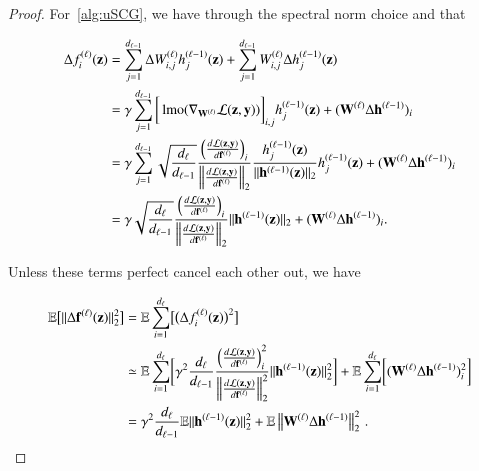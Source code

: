 

\begin{proof}
For~\cref{alg:uSCG}, we have through the spectral norm choice  and  that


\begin{equation*}
\begin{split}
    \Delta f^{(\ell)}_i(\mathbf{z}) &= \sum_{j=1}^{d_{\ell-1}} \Delta W^{(\ell)}_{i,j} h^{(\ell-1)}_j(\mathbf{z}) + \sum_{j=1}^{d_{\ell-1}} W^{(\ell)}_{i,j} \Delta h^{(\ell-1)}_j(\mathbf{z}) \\
    &= \gamma \sum_{j=1}^{d_{\ell-1}} \bigg[\operatorname{lmo}(\nabla_{\mathbf{W}^{(\ell)}} \mathcal{L}(\mathbf{z},\mathbf{y}))\bigg]_{i,j} h^{(\ell-1)}_j(\mathbf{z}) + (\mathbf{W}^{(\ell)} \Delta \mathbf{h}^{(\ell-1)})_i \\
    &= \gamma \sum_{j=1}^{d_{\ell-1}} \sqrt{\frac{d_{\ell}}{d_{\ell-1}}} \frac{\Bigl(\frac{d \mathcal{L}(\mathbf{z},\mathbf{y}) }{d \mathbf{f}^{(\ell)}} \Bigr)_i}{\Bigl\|\frac{d \mathcal{L}(\mathbf{z},\mathbf{y}) }{d \mathbf{f}^{(\ell)}}\Bigr\|_2}  \frac{h^{(\ell-1)}_j(\mathbf{z})}{\|\mathbf{h}^{(\ell-1)}(\mathbf{z})\|_2}  h^{(\ell-1)}_j(\mathbf{z}) + (\mathbf{W}^{(\ell)} \Delta \mathbf{h}^{(\ell-1)})_i \\
    &= \gamma \sqrt{\frac{d_{\ell}}{d_{\ell-1}}} \frac{\Bigl(\frac{d \mathcal{L}(\mathbf{z},\mathbf{y}) }{d \mathbf{f}^{(\ell)}} \Bigr)_i}{\Bigl\|\frac{d \mathcal{L}(\mathbf{z},\mathbf{y}) }{d \mathbf{f}^{(\ell)}}\Bigr\|_2}  \|\mathbf{h}^{(\ell-1)}(\mathbf{z})\|_2 + (\mathbf{W}^{(\ell)} \Delta \mathbf{h}^{(\ell-1)})_i.
\end{split}
\end{equation*}

Unless these terms perfect cancel each other out, we have

\begin{equation*}
\begin{split}
    \mathbb{E}\bigl[\|\Delta \mathbf{f}^{(\ell)}(\mathbf{z})\|_2^2\bigr] &= \mathbb{E}\sum_{i=1}^{d_{\ell}} \bigl[\big(\Delta f^{(\ell)}_i(\mathbf{z})\big)^2\bigr] \\
    &\simeq \mathbb{E}\sum_{i=1}^{d_{\ell}} \biggl[\gamma^2 \frac{d_{\ell}}{d_{\ell-1}} \frac{\Bigl(\frac{d \mathcal{L}(\mathbf{z},\mathbf{y}) }{d \mathbf{f}^{(\ell)}} \Bigr)_i^2}{\Bigl\|\frac{d \mathcal{L}(\mathbf{z},\mathbf{y}) }{d \mathbf{f}^{(\ell)}}\Bigr\|_2^2}  \|\mathbf{h}^{(\ell-1)}(\mathbf{z})\|_2^2\biggr] + \mathbb{E}\sum_{i=1}^{d_{\ell}}\biggl[(\mathbf{W}^{(\ell)} \Delta \mathbf{h}^{(\ell-1)})_i^2\biggr]\\
    &= \gamma^2 \frac{d_{\ell}}{d_{\ell-1}} \mathbb{E}\|\mathbf{h}^{(\ell-1)}(\mathbf{z})\|_2^2 + \mathbb{E}\left \| \mathbf{W}^{(\ell)} \Delta \mathbf{h}^{(\ell-1)} \right \|_2^2\,.
\end{split}
\end{equation*}



\end{proof}
